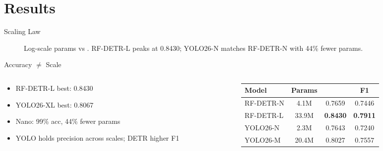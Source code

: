 \section{Results}

\begin{frame}{Scaling Law}
	\begin{figure}
		\centering
		
		\caption{Log-scale params vs \mapf. RF-DETR-L peaks at 0.8430; YOLO26-N matches RF-DETR-N with 44\% fewer params.}
		\label{fig:slides-pareto}
	\end{figure}
\end{frame}

\begin{frame}{Accuracy $\neq$ Scale}
	\begin{columns}[T]
		\begin{column}{0.47\textwidth}
			\begin{itemize}
				\item RF-DETR-L best: 0.8430 \mapf
				\item YOLO26-XL best: 0.8067
				\item Nano: 99\% acc, 44\% fewer params
				\item YOLO holds precision across scales; DETR higher F1
			\end{itemize}
		\end{column}
		\begin{column}{0.49\textwidth}
			\scriptsize
			\begin{tabular}{lccc}
				\toprule
				\textbf{Model} & \textbf{Params} & \textbf{\mapf}  & \textbf{F1}     \\
				\midrule
				RF-DETR-N      & 4.1M            & 0.7659          & 0.7446          \\
				RF-DETR-L      & 33.9M           & \textbf{0.8430} & \textbf{0.7911} \\
				YOLO26-N       & 2.3M            & 0.7643          & 0.7240          \\
				YOLO26-M       & 20.4M           & 0.8027          & 0.7557          \\
				\bottomrule
			\end{tabular}
		\end{column}
	\end{columns}
\end{frame}

